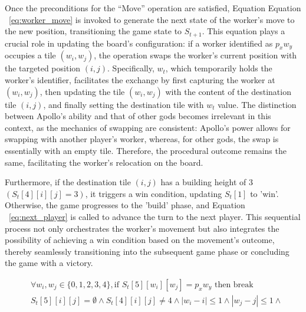 \documentclass{telkomnika}
\begin{document}
Once the preconditions for the ``Move'' operation are satisfied, Equation Equation ~\ref{eq:worker_move} is invoked to generate the next state of the worker's move to the new position, transitioning the game state to \( S_{t+1} \). This equation plays a crucial role in updating the board's configuration: if a worker identified as \( p_xw_y \) occupies a tile \( (w_i, w_j) \), the operation swaps the worker's current position with the targeted position \( (i, j) \). Specifically, \( w_t \), which temporarily holds the worker's identifier, facilitates the exchange by first capturing the worker at \( (w_i, w_j) \), then updating the tile \( (w_i, w_j) \) with the content of the destination tile \( (i, j) \), and finally setting the destination tile with \( w_t \) value. The distinction between Apollo's ability and that of other gods becomes irrelevant in this context, as the mechanics of swapping are consistent: Apollo's power allows for swapping with another player's worker, whereas, for other gods, the swap is essentially with an empty tile. Therefore, the procedural outcome remains the same, facilitating the worker's relocation on the board.

Furthermore, if the destination tile \( (i, j) \) has a building height of 3 \( (S_t[4][i][j] = 3) \), it triggers a win condition, updating \( S_t[1] \) to 'win'. Otherwise, the game progresses to the 'build' phase, and Equation ~\ref{eq:next_player} is called to advance the turn to the next player. This sequential process not only orchestrates the worker's movement but also integrates the possibility of achieving a win condition based on the movement's outcome, thereby seamlessly transitioning into the subsequent game phase or concluding the game with a victory.

    
\begin{equation}
 \begin{aligned}
    &\forall w_i, w_j \in \{0,1,2,3,4\},\text{if } S_t[5][w_i][w_j] = p_x w_y \text{ then break}\\
    &S_t[5][i][j]=\emptyset \land S_t[4][i][j]\neq 4 \land |w_i-i|\leq 1 \land |w_j-j| \leq 1 \land\\
 \end{aligned}
\label{eq:chk_worker_build}
\end{equation}
\end{document}
